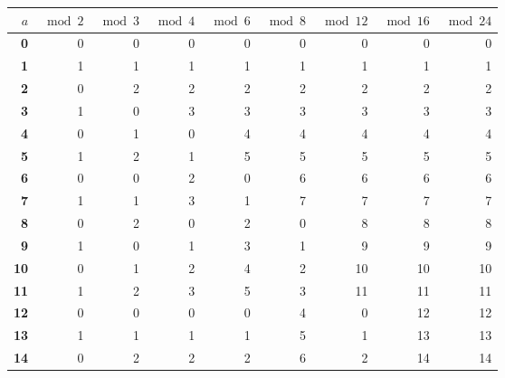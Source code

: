 \documentclass[11pt,a4paper]{article}
\theoremstyle{remark}
\theoremstyle{plain}
\begin{document}
\vspace{1em}
\noindent
\begin{tabular}{>{\bfseries}r|rrrrrrrr}
\toprule
$a$ & $\bmod 2$ & $\bmod 3$ & $\bmod 4$ & $\bmod 6$ & $\bmod 8$ & $\bmod 12$ & $\bmod 16$ & $\bmod 24$ \\
\midrule
  \textbf{0} & 0 & 0 & 0 & 0 & 0 & 0 & 0 & 0 \\
  \textbf{1} & \cellcolor{res1}1 & \cellcolor{res1}1 & \cellcolor{res1}1 & \cellcolor{res1}1 & \cellcolor{res1}1 & \cellcolor{res1}1 & \cellcolor{res1}1 & \cellcolor{res1}1 \\
  \hline
  \textbf{2} & 0 & 2 & 2 & 2 & 2 & 2 & 2 & 2 \\
  \textbf{3} & \cellcolor{res1}1 & \cellcolor{res0}0 & \cellcolor{res3}3 & \cellcolor{res3}3 & \cellcolor{res3}3 & \cellcolor{res3}3 & \cellcolor{res3}3 & \cellcolor{res3}3 \\
  \hline
  \textbf{4} & 0 & 1 & 0 & 4 & 4 & 4 & 4 & 4 \\
  \textbf{5} & \cellcolor{res1}1 & \cellcolor{res2}2 & \cellcolor{res1}1 & \cellcolor{res5}5 & \cellcolor{res5}5 & \cellcolor{res5}5 & \cellcolor{res5}5 & \cellcolor{res5}5 \\
  \hline
  \textbf{6} & 0 & 0 & 2 & 0 & 6 & 6 & 6 & 6 \\
  \textbf{7} & \cellcolor{res1}1 & \cellcolor{res1}1 & \cellcolor{res3}3 & \cellcolor{res1}1 & \cellcolor{res7}7 & \cellcolor{res7}7 & \cellcolor{res7}7 & \cellcolor{res7}7 \\
  \hline
  \textbf{8} & 0 & 2 & 0 & 2 & 0 & 8 & 8 & 8 \\
  \textbf{9} & \cellcolor{res1}1 & \cellcolor{res0}0 & \cellcolor{res1}1 & \cellcolor{res3}3 & \cellcolor{res1}1 & \cellcolor{res9}9 & \cellcolor{res9}9 & \cellcolor{res9}9 \\
  \hline
  \textbf{10} & 0 & 1 & 2 & 4 & 2 & 10 & 10 & 10 \\
  \textbf{11} & \cellcolor{res1}1 & \cellcolor{res2}2 & \cellcolor{res3}3 & \cellcolor{res5}5 & \cellcolor{res3}3 & \cellcolor{res11}11 & \cellcolor{res11}11 & \cellcolor{res11}11 \\
  \hline
  \textbf{12} & 0 & 0 & 0 & 0 & 4 & 0 & 12 & 12 \\
  \textbf{13} & \cellcolor{res1}1 & \cellcolor{res1}1 & \cellcolor{res1}1 & \cellcolor{res1}1 & \cellcolor{res5}5 & \cellcolor{res1}1 & \cellcolor{res13}13 & \cellcolor{res13}13 \\
  \hline
  \textbf{14} & 0 & 2 & 2 & 2 & 6 & 2 & 14 & 14 \\

\end{tabular}
\end{document}
